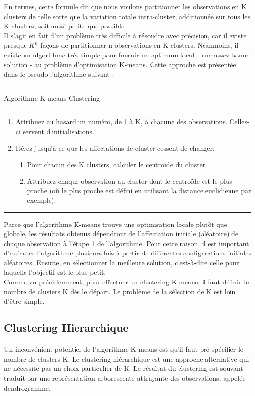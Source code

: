 \documentclass{report}
\begin{document}
En termes, cette formule dit que nous voulons partitionner les observations en K clusters de telle sorte que la variation totale intra-cluster, additionnée sur tous les K clusters, soit aussi petite que possible.\\
Il s'agit en fait d'un problème très difficile à résoudre avec précision, car il existe presque $K^{n} $ façons de partitionner n observations en K clusters. Néanmoins, il existe un algorithme très simple pour fournir un optimum local - une assez bonne solution - au problème d'optimisation K-means. Cette approche est présentée dans le pseudo l'algorithme suivant :\\
\rule{\linewidth}{.1pt} 
\Large{Algorithme} K-means Clustering\\
\rule{\linewidth}{.1pt} 
\begin{enumerate}
\item Attribuez au hasard un numéro, de 1 à K, à chacune des observations.
Celles-ci servent d'initialisations.
\item Itérez jusqu'à ce que les affectations de cluster cessent de changer: 
\begin{enumerate}
\item Pour chacun des K clusters, calculer le centroïde du cluster.
\item Attribuez chaque observation au cluster dont le centroïde est le plus proche (où le plus proche est défini en utilisant la distance euclidienne par exemple).
\end{enumerate}
\end{enumerate}
\rule{\linewidth}{.1pt} 

Parce que l'algorithme K-means trouve une optimisation locale plutôt que globale, les résultats obtenus dépendront de l'affectation initiale (aléatoire) de chaque observation à l'étape 1 de l'algorithme. Pour cette raison, il est important d'exécuter l'algorithme plusieurs fois à partir de différentes configurations initiales aléatoires. Ensuite, en sélectionner la meilleure solution, c'est-à-dire celle pour laquelle l'objectif est le plus petit.\\
Comme vu précédemment, pour effectuer un clustering K-means, il faut définir le nombre de clusters K dés le départ. Le problème de la sélection de K est loin d'être simple. 

\subsection{Clustering Hierarchique}
\paragraph{}
Un inconvénient potentiel de l'algorithme K-means est qu'il faut pré-spécifier le nombre de clusters K. Le clustering hiérarchique est une approche alternative qui ne nécessite pas un choix particulier de K. Le résultat du clustering est souvant traduit par une représentation arborescente attrayante des observations, appelée dendrogramme.\\
\end{document}
